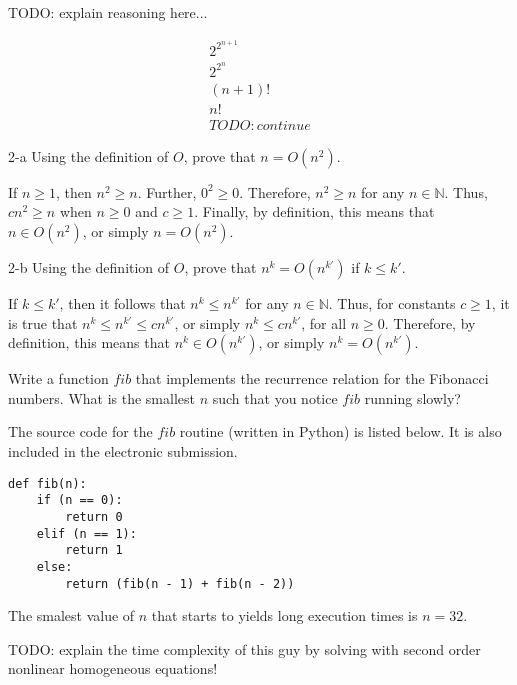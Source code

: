 \documentclass[11pt]{article}
\begin{document}
\begin{prob}{1}
\end{prob}
\begin{sol} 
TODO: explain reasoning here...

\begin{eqnarray*}
2^{2^{n+1}} \\
2^{2^{n}} \\ 
(n+1)! \\
n! \\
TODO: continue
\end{eqnarray*}
\end{sol}

\begin{prob}{2-a}
Using the definition of $O$, prove that $n = O(n^{2})$.
\end{prob}
\begin{sol} 
If $n \geq 1$, then $n^{2} \geq n$. Further, $0^{2} \geq 0$. Therefore, $n^{2} \geq n$ for any $n \in \mathbb{N}$. Thus, $cn^{2} \geq n$ when $n \geq 0$ and $c \geq 1$. Finally, by definition, this means that $n \in O(n^{2})$, or simply $n = O(n^{2})$.
\end{sol}

\begin{prob}{2-b}
Using the definition of $O$, prove that $n^{k} = O(n^{k'})$ if $k \leq k'$.
\end{prob}
\begin{sol} 

If $k \leq k'$, then it follows that $n^{k} \leq n^{k'}$ for any $n \in \mathbb{N}$. Thus, for constants $c \geq 1$, it is true that $n^{k} \leq n^{k'} \leq cn^{k'}$, or simply $n^{k} \leq cn^{k'}$, for all $n \geq 0$. Therefore, by definition, this means that $n^{k} \in O(n^{k'})$, or simply $n^{k} = O(n^{k'})$.

\end{sol}

\begin{prob}{3}
Write a function $fib$ that implements the recurrence relation for the Fibonacci numbers. What is the smallest $n$ such that you notice $fib$ running slowly?
\end{prob}
\begin{sol} 
The source code for the $fib$ routine (written in Python) is listed below. It is also included in the electronic submission.

\begin{lstlisting}
def fib(n):
	if (n == 0):
		return 0
	elif (n == 1):
		return 1
	else:
		return (fib(n - 1) + fib(n - 2))
\end{lstlisting}

The smalest value of $n$ that starts to yields long execution times is $n = 32$.

TODO: explain the time complexity of this guy by solving with second order nonlinear homogeneous equations!
\end{sol}
\end{document}
